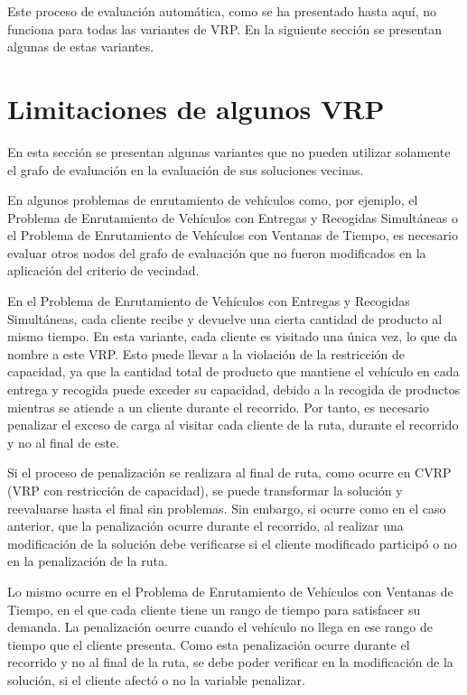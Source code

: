 Este proceso de evaluación automática, como se ha presentado hasta aquí, no funciona para todas las variantes de VRP. En la siguiente sección se presentan algunas de estas variantes.

\section{Limitaciones de algunos VRP}\label{3:VRP-limits}

En esta sección se presentan algunas variantes que no pueden utilizar solamente el grafo de evaluación en la evaluación de sus soluciones vecinas.

En algunos problemas de enrutamiento de vehículos como, por ejemplo, el Problema de Enrutamiento de Vehículos con Entregas y Recogidas Simultáneas o el Problema de Enrutamiento de Vehículos con Ventanas de Tiempo, es necesario evaluar otros nodos del grafo de evaluación que no fueron modificados en la aplicación del criterio de vecindad.

En el Problema de Enrutamiento de Vehículos con Entregas y Recogidas Simultáneas, cada cliente recibe y devuelve una cierta cantidad de producto al mismo tiempo. En esta variante, cada cliente es visitado una única vez, lo que da nombre a este VRP. Esto puede llevar a la violación de la restricción de capacidad, ya que la cantidad total de producto que mantiene el vehículo en cada entrega y recogida puede exceder su capacidad, debido a la recogida de productos mientras se atiende a un cliente durante el recorrido. Por tanto, es necesario penalizar el exceso de carga al visitar cada cliente de la ruta, durante el recorrido y no al final de este.

Si el proceso de penalización se realizara al final de ruta, como ocurre en CVRP (VRP con restricción de capacidad), se puede transformar la solución y reevaluarse hasta el final sin problemas. Sin embargo, si ocurre como en el caso anterior, que la penalización ocurre durante el recorrido, al realizar una modificación de la solución debe verificarse si el cliente modificado participó o no en la penalización de la ruta.

Lo mismo ocurre en el Problema de Enrutamiento de Vehículos con Ventanas de Tiempo, en el que cada cliente tiene un rango de tiempo para satisfacer su demanda. La penalización ocurre cuando el vehículo no llega en ese rango de tiempo que el cliente presenta. Como esta penalización ocurre durante el recorrido y no al final de la ruta, se debe poder verificar en la modificación de la solución, si el cliente afectó o no la variable penalizar.

